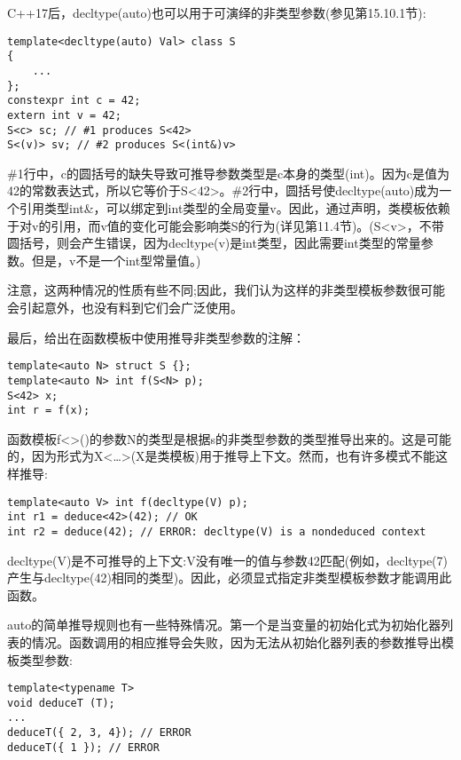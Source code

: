 C++17后，decltype(auto)也可以用于可演绎的非类型参数(参见第15.10.1节):

\begin{lstlisting}[style=styleCXX]
template<decltype(auto) Val> class S
{
	...
};
constexpr int c = 42;
extern int v = 42;
S<c> sc; // #1 produces S<42>
S<(v)> sv; // #2 produces S<(int&)v>
\end{lstlisting}

\#1行中，c的圆括号的缺失导致可推导参数类型是c本身的类型(int)。因为c是值为42的常数表达式，所以它等价于S<42>。\#2行中，圆括号使decltype(auto)成为一个引用类型int\&，可以绑定到int类型的全局变量v。因此，通过声明，类模板依赖于对v的引用，而v值的变化可能会影响类S的行为(详见第11.4节)。(S<v>，不带圆括号，则会产生错误，因为decltype(v)是int类型，因此需要int类型的常量参数。但是，v不是一个int型常量值。)

注意，这两种情况的性质有些不同;因此，我们认为这样的非类型模板参数很可能会引起意外，也没有料到它们会广泛使用。

最后，给出在函数模板中使用推导非类型参数的注解：

\begin{lstlisting}[style=styleCXX]
template<auto N> struct S {};
template<auto N> int f(S<N> p);
S<42> x;
int r = f(x);
\end{lstlisting}

函数模板f<>()的参数N的类型是根据s的非类型参数的类型推导出来的。这是可能的，因为形式为X<…>(X是类模板)用于推导上下文。然而，也有许多模式不能这样推导:

\begin{lstlisting}[style=styleCXX]
template<auto V> int f(decltype(V) p);
int r1 = deduce<42>(42); // OK
int r2 = deduce(42); // ERROR: decltype(V) is a nondeduced context
\end{lstlisting}

decltype(V)是不可推导的上下文:V没有唯一的值与参数42匹配(例如，decltype(7)产生与decltype(42)相同的类型)。因此，必须显式指定非类型模板参数才能调用此函数。



auto的简单推导规则也有一些特殊情况。第一个是当变量的初始化式为初始化器列表的情况。函数调用的相应推导会失败，因为无法从初始化器列表的参数推导出模板类型参数:

\begin{lstlisting}[style=styleCXX]
template<typename T>
void deduceT (T);
...
deduceT({ 2, 3, 4}); // ERROR
deduceT({ 1 }); // ERROR
\end{lstlisting}

